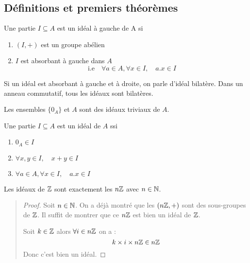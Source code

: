 \subsection{Définitions et premiers théorèmes}

\newpage

\begin{definition}[Idéal]
    Une partie $I \subseteq A$ est un idéal à gauche de A si 
    \begin{enumerate}[label=\roman*)]
        \item $(I,+)$ est un groupe abélien 
        \item $I$ est absorbant à gauche dans $A$ 
            \[ \text{i.e} \quad \forall a \in A, \forall x \in I, \quad a.x \in I \] 
    \end{enumerate}
    Si un idéal est absorbant à gauche et à droite, on parle d'idéal bilatère. 
    Dans un anneau commutatif, tous les idéaux sont bilatères. 
\end{definition}

\begin{remark}
    Les ensembles $ \{ 0_A \}$ et $A$ sont des idéaux triviaux de $A$.  
\end{remark}

\begin{proposition}
    Une partie $I \subseteq A$ est un idéal de $A$ ssi 
    \begin{enumerate}[label=\roman*)]
        \item $0_A \in I$ 
        \item $ \forall x,y \in I, \quad x + y \in I$ 
        \item $\forall a \in A, \forall x \in I, \quad a.x \in I $ 
    \end{enumerate}
\end{proposition}

\begin{theorem}[Idéaux de $\Z$]
    Les idéaux de $\Z$ sont exactement les $n\mathbb{Z}$ avec $ n \in \mathbb{N}$. 
\end{theorem}

\begin{quote}
\begin{footnotesize}
    \begin{proof}
        Soit $n \in \mathbb{N}$. On a déjà montré que les $(n\mathbb{Z},+)$ sont des sous-groupes de $\Z$. 
        Il suffit de montrer que ce $n\mathbb{Z}$ est bien un idéal de $\Z$. 

        Soit $k \in \mathbb{Z}$ alors $ \forall i \in n\mathbb{Z}$ on a : 
            \[ k \times i \times n\mathbb{Z} \in n\mathbb{Z} \]
        Donc c'est bien un idéal. 
    \end{proof}
\end{footnotesize}
\end{quote}

